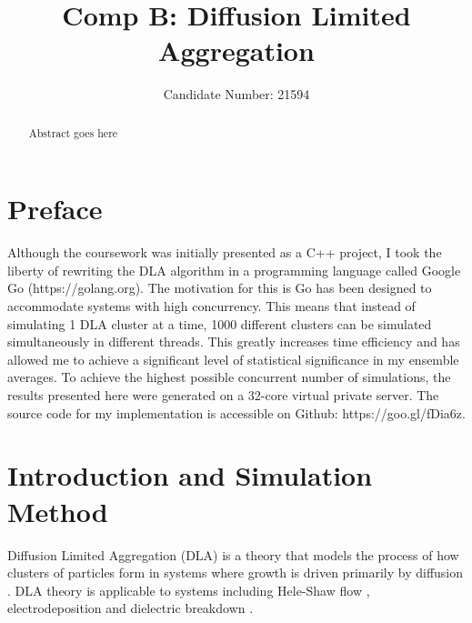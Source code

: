 \documentclass[11pt]{iopart}
\begin{document}
\setlength{\marginparwidth}{1.5cm}

\title[]{Comp B: Diffusion Limited Aggregation}

\author{Candidate Number: 21594}

\address{Department of Physics,
University of Bath, Bath BA2 7AY, United Kingdom}
\begin{abstract}
Abstract goes here
\end{abstract}



\section*{Preface}
Although the coursework was initially presented as a C++ project, I took the liberty of rewriting the DLA algorithm in a programming language called Google Go (https://golang.org). The motivation for this is Go has been designed to accommodate systems with high concurrency. This means that instead of simulating 1 DLA cluster at a time, 1000 different clusters can be simulated simultaneously in different threads. This greatly increases time efficiency and has allowed me to achieve a significant level of statistical significance in my ensemble averages. To achieve the highest possible concurrent number of simulations, the results presented here were generated on a 32-core virtual private server. The source code for my implementation is accessible on Github: https://goo.gl/fDia6z.

\section{Introduction and Simulation Method}

Diffusion Limited Aggregation (DLA) is a theory that models the process of how clusters of particles form in systems where growth is driven primarily by diffusion \cite{dla}. DLA theory is applicable to systems including Hele-Shaw flow \cite{heleshaw}, electrodeposition \cite{electrodeposition} and dielectric breakdown \cite{electricbreakdown}.
\end{document}
